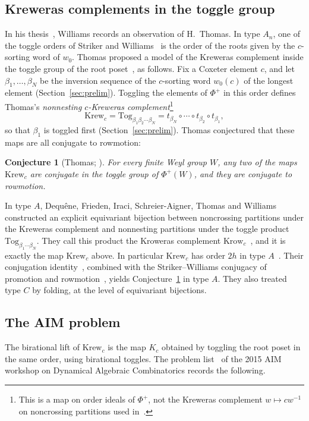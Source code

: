 \documentclass[11pt]{amsart}
\newtheorem{conjecture}[theorem]{Conjecture}
\theoremstyle{definition}
\newcommand{\Tog}{\mathrm{Tog}}
\begin{document}
\subsection{Kreweras complements in the toggle group}
In his thesis~\cite[\S4.4.1]{Wil}, Williams records an observation of H.~Thomas. In type $A_n$, one of the toggle orders of Striker and Williams~\cite{SW} is the order of the roots given by the $c$-sorting word of $w_0$. Thomas proposed a model of the Kreweras complement inside the toggle group of the root poset~\cite[Def.~4.4.4]{Wil}, as follows. Fix a Coxeter element $c$, and let $\beta_1,\dots,\beta_N$ be the inversion sequence of the $c$-sorting word $w_0(c)$ of the longest element (Section~\ref{sec:prelim}). Toggling the elements of $\Phi^+$ in this order defines Thomas's \emph{nonnesting $c$-Kreweras complement}\footnote{This is a map on order ideals of $\Phi^+$, not the Kreweras complement $w\mapsto cw^{-1}$ on noncrossing partitions used in~\cite{AST}.}
\[\mathrm{Krew}_c=\Tog_{\beta_1\beta_2\cdots\beta_N}=t_{\beta_N}\circ\cdots\circ t_{\beta_2}\circ t_{\beta_1},\]
so that $\beta_1$ is toggled first (Section~\ref{sec:prelim}).
Thomas conjectured that these maps are all conjugate to rowmotion:

\begin{conjecture}[Thomas; {\cite[Conj.~4.4.5]{Wil}}]\label{conj:thomas}
For every finite Weyl group $W$, any two of the maps $\mathrm{Krew}_c$ are conjugate in the toggle group of $\Phi^+(W)$, and they are conjugate to rowmotion.
\end{conjecture}

In type $A$, Dequ\^ene, Frieden, Iraci, Schreier-Aigner, Thomas and Williams~\cite{DFISTW} constructed an explicit equivariant bijection between noncrossing partitions under the Kreweras complement and nonnesting partitions under the toggle product $\Tog_{\beta_1\cdots\beta_N}$. They call this product the Kroweras complement $\mathrm{Krow}_c$~\cite[Def.~4.2]{DFISTW}, and it is exactly the map $\mathrm{Krew}_c$ above. In particular $\mathrm{Krew}_c$ has order $2h$ in type $A$~\cite[Cor.~1.6]{DFISTW}. Their conjugation identity~\cite[Prop.~4.7]{DFISTW}, combined with the Striker--Williams conjugacy of promotion and rowmotion~\cite{SW}, yields Conjecture~\ref{conj:thomas} in type $A$. They also treated type $C$ by folding, at the level of equivariant bijections.

\subsection{The AIM problem}
The birational lift of $\mathrm{Krew}_c$ is the map $K_c$ obtained by toggling the root poset in the same order, using birational toggles. The problem list~\cite{AIM} of the 2015 AIM workshop on Dynamical Algebraic Combinatorics records the following.
\end{document}
